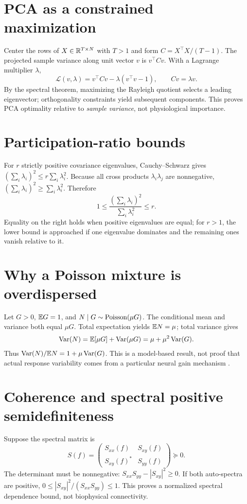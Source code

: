 \section{PCA as a constrained maximization}
Center the rows of $X\in\mathbb{R}^{T\times N}$ with $T>1$ and
form $C=X^\top X/(T-1)$. The projected sample variance
along unit vector $v$ is $v^\top Cv$.
With a Lagrange multiplier $\lambda$,
\[
\mathcal L(v,\lambda)=v^\top Cv-\lambda(v^\top v-1),
\qquad Cv=\lambda v.
\]
By the spectral theorem, maximizing the Rayleigh quotient
selects a leading eigenvector; orthogonality constraints
yield subsequent components.
This proves PCA optimality relative to \emph{sample variance},
not physiological importance.

\section{Participation-ratio bounds}
For $r$ strictly positive covariance eigenvalues,
Cauchy--Schwarz gives
$(\sum_i\lambda_i)^2\leq r\sum_i\lambda_i^2$.
Because all cross products $\lambda_i\lambda_j$ are nonnegative,
$(\sum_i\lambda_i)^2\geq\sum_i\lambda_i^2$.
Therefore
\[
1\leq\frac{(\sum_i\lambda_i)^2}{\sum_i\lambda_i^2}\leq r.
\]
Equality on the right holds when positive eigenvalues are equal;
for $r>1$, the lower bound is approached if one eigenvalue
dominates and the remaining ones vanish relative to it.

\section{Why a Poisson mixture is overdispersed}
Let $G>0$, $\mathbb{E} G=1$, and $N\mid G\sim\operatorname{Poisson}(\mu G)$.
The conditional mean and variance both equal $\mu G$.
Total expectation yields $\mathbb{E} N=\mu$; total variance gives
\[
\operatorname{Var}(N)=\mathbb{E}[\mu G]+\operatorname{Var}(\mu G)
=\mu+\mu^2\operatorname{Var}(G).
\]
Thus $\operatorname{Var}(N)/\mathbb{E} N=1+\mu\operatorname{Var}(G)$.
This is a model-based result, not proof that actual response
variability comes from a particular neural gain mechanism
\cite{goris2014}.

\section{Coherence and spectral positive semidefiniteness}
Suppose the spectral matrix is
\[
S(f)=
\begin{pmatrix}
S_{xx}(f)&S_{xy}(f)\\
S_{xy}(f)^*&S_{yy}(f)
\end{pmatrix}\succeq0.
\]
The determinant must be nonnegative:
$S_{xx}S_{yy}-|S_{xy}|^2\geq0$.
If both auto-spectra are positive,
$0\leq |S_{xy}|^2/(S_{xx}S_{yy})\leq1$.
This proves a normalized spectral dependence bound, not
biophysical connectivity.

